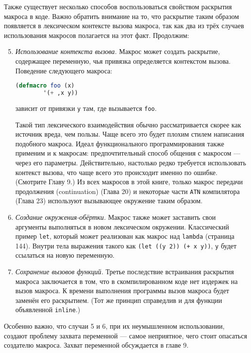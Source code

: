\documentclass[12pt, a4paper]{article} %
\begin{document}
Также существует несколько способов воспользоваться свойством раскрытия макроса в коде. Важно обратить внимание на то, что раскрытие таким образом появляется в лексическом контексте вызова макроса, так как два из трёх случаев использования макросов полагается на этот факт. Продолжим:

\begin{enumerate} \setcounter{enumi}{4}
    \item \textit{Использование контекста вызова.} Макрос может создать раскрытие, содержащее переменную, чья привязка определяется контекстом вызова. Поведение следующего макроса:
\begin{lstlisting}[language=Lisp]
    (defmacro foo (x)
        '(+ ,x y))
\end{lstlisting}
    зависит от привязки \texttt{y} там, где вызывается \texttt{foo}.

    Такой тип лексического взаимодействия обычно рассматривается скорее как источник вреда, чем пользы. Чаще всего это будет плохим стилем написания подобного макроса. Идеал функционального программирования также применим и к макросам: предпочтительный способ общения с макросом --- через его параметры. Действительно, настолько редко требуется использовать контекст вызова, что чаще всего это происходит именно по ошибке. (Смотрите Главу 9.) Из всех макросов в этой книге, только макрос передачи продолжения (continuation) (Глава 20) и некоторые части \texttt{ATN} компилятора (Глава 23) используют вызывающее окружение таким образом. 
    \item \textit{Создание окружения-обёртки.} Макрос также может заставить свои аргументы выполняться в новом лексическом окружении. Классический пример \texttt{let}, который может реализован как макрос над \texttt{lambda} (страница 144). Внутри тела выражения такого как \texttt{(let ((y 2)) (+ x y))}, \texttt{y} будет ссылаться на новую переменную.

    \item \textit{Сохранение вызовов функций.} Третье последствие встраивания раскрытия макроса заключается в том, что в скомпилированном коде нет издержек на вызов макроса. К времени выполнения программы вызов макроса будет заменён его раскрытием. (Тот же принцип справедлив и для функции объявленной \texttt{inline}.)
\end{enumerate}

Особенно важно, что случаи 5 и 6, при их неумышленном использовании, создают проблему захвата переменной --- самое неприятное, чего стоит опасаться создателю макроса. Захват переменной обсуждается в главе 9.
\end{document}
